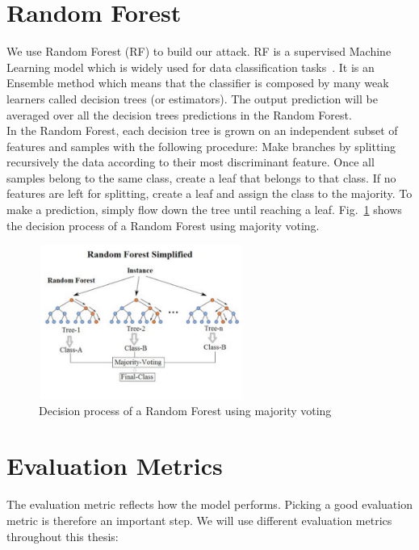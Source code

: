 \section{Random Forest}
\label{sec:RF}
We use Random Forest (RF) to build our attack. RF is a supervised Machine Learning model which is widely used for data classification tasks~\cite{breiman2001random}. It is an Ensemble method which means that the classifier is composed by many weak learners called decision trees (or estimators). The output prediction will be averaged over all the decision trees predictions in the Random Forest.  \\ 

In the Random Forest, each decision tree is grown on an independent subset of features and samples with the following procedure: Make branches by splitting recursively the data according to their most discriminant feature. Once all samples belong to the same class, create a leaf that belongs to that class. If no features are left for splitting, create a leaf and assign the class to the majority. To make a prediction, simply flow down the tree until reaching a leaf. Fig.~\ref{fig:random_forest} shows the decision process of a Random Forest using majority voting. 

\begin{figure}[H]
 \centering
 \includegraphics[width=0.6\textwidth]{figures/random-forest.png}
 \caption[test]{Decision process of a Random Forest using majority voting\footnotemark}
 \label{fig:random_forest}
\end{figure}



\newpage


\section{Evaluation Metrics}
\label{sec:background evaluation}
The evaluation metric reflects how the model performs. Picking a good evaluation metric is therefore an important step. We will use different evaluation metrics throughout this thesis:

